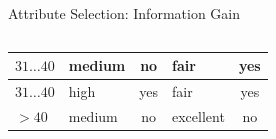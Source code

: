\begin{frame}{Attribute Selection: Information Gain}
\begin{columns}
\begin{column}{0.45\textwidth}
{\begin{tabular}{|l|l|c|l|c|}
          \cellcolor{yellow!20}$31\ldots40$ & \cellcolor{yellow!20}medium & \cellcolor{yellow!20}no & \cellcolor{yellow!20}fair & \cellcolor{green!20}yes \\\hline
          \cellcolor{yellow!20}$31\ldots40$ & \cellcolor{yellow!20}high & \cellcolor{yellow!20}yes & \cellcolor{yellow!20}fair & \cellcolor{green!20}yes \\\hline
          \cellcolor{yellow!20}$>40$ & \cellcolor{yellow!20}medium & \cellcolor{yellow!20}no & \cellcolor{yellow!20}excellent & \cellcolor{red!20}no \\\hline
        \end{tabular}}
    \end{column}
  \end{columns}
\end{frame}

